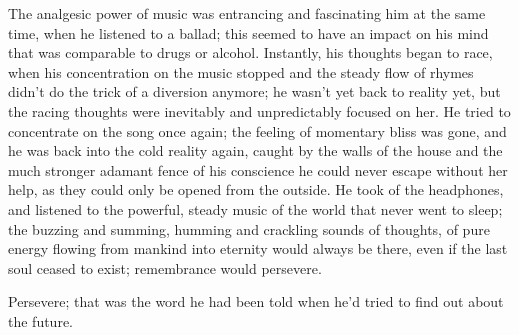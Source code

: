 The analgesic power of music was entrancing and fascinating him at the same time, when he listened to a ballad; this seemed to have an impact on his mind that was comparable to drugs or alcohol. Instantly, his thoughts began to race, when his concentration on the music stopped and the steady flow of rhymes didn't do the trick of a diversion anymore; he wasn't yet back to reality yet, but the racing thoughts were inevitably and unpredictably focused on her. He tried to concentrate on the song once again; the feeling of momentary bliss was gone, and he was back into the cold reality again, caught by the walls of the house and the much stronger adamant fence of his conscience he could never escape without her help, as they could only be opened from the outside. 
He took of the headphones, and listened to the powerful, steady music of the world that never went to sleep; the buzzing and summing, humming and crackling sounds of thoughts, of pure energy flowing from mankind into eternity would always be there, even if the last soul ceased to exist; remembrance would persevere.

Persevere; that was the word he had been told when he'd tried to find out about the future.

